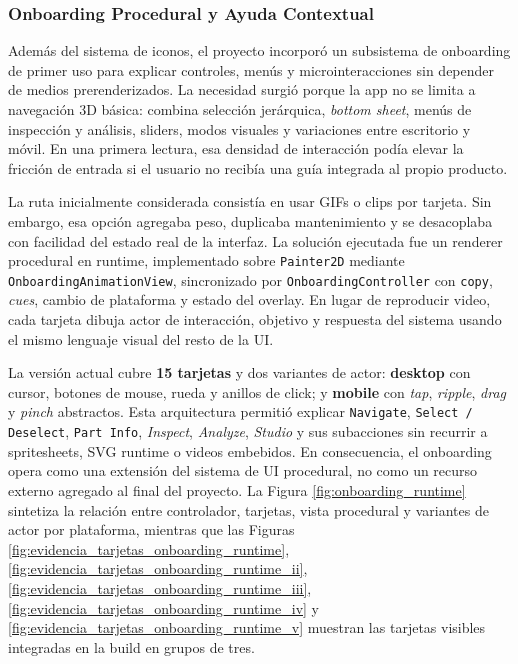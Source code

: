\subsubsection{Onboarding Procedural y Ayuda Contextual}

Además del sistema de iconos, el proyecto incorporó un subsistema de onboarding de primer uso para explicar controles, menús y microinteracciones sin depender de medios prerenderizados. La necesidad surgió porque la app no se limita a navegación 3D básica: combina selección jerárquica, \textit{bottom sheet}, menús de inspección y análisis, sliders, modos visuales y variaciones entre escritorio y móvil. En una primera lectura, esa densidad de interacción podía elevar la fricción de entrada si el usuario no recibía una guía integrada al propio producto.

La ruta inicialmente considerada consistía en usar GIFs o clips por tarjeta. Sin embargo, esa opción agregaba peso, duplicaba mantenimiento y se desacoplaba con facilidad del estado real de la interfaz. La solución ejecutada fue un renderer procedural en runtime, implementado sobre \texttt{Painter2D} mediante \texttt{OnboardingAnimationView}, sincronizado por \texttt{OnboardingController} con \texttt{copy}, \textit{cues}, cambio de plataforma y estado del overlay. En lugar de reproducir video, cada tarjeta dibuja actor de interacción, objetivo y respuesta del sistema usando el mismo lenguaje visual del resto de la UI.

La versión actual cubre \textbf{15 tarjetas} y dos variantes de actor: \textbf{desktop} con cursor, botones de mouse, rueda y anillos de click; y \textbf{mobile} con \textit{tap}, \textit{ripple}, \textit{drag} y \textit{pinch} abstractos. Esta arquitectura permitió explicar \texttt{Navigate}, \texttt{Select / Deselect}, \texttt{Part Info}, \textit{Inspect}, \textit{Analyze}, \textit{Studio} y sus subacciones sin recurrir a spritesheets, SVG runtime o videos embebidos. En consecuencia, el onboarding opera como una extensión del sistema de UI procedural, no como un recurso externo agregado al final del proyecto. La Figura \ref{fig:onboarding_runtime} sintetiza la relación entre controlador, tarjetas, vista procedural y variantes de actor por plataforma, mientras que las Figuras \ref{fig:evidencia_tarjetas_onboarding_runtime}, \ref{fig:evidencia_tarjetas_onboarding_runtime_ii}, \ref{fig:evidencia_tarjetas_onboarding_runtime_iii}, \ref{fig:evidencia_tarjetas_onboarding_runtime_iv} y \ref{fig:evidencia_tarjetas_onboarding_runtime_v} muestran las tarjetas visibles integradas en la build en grupos de tres.

